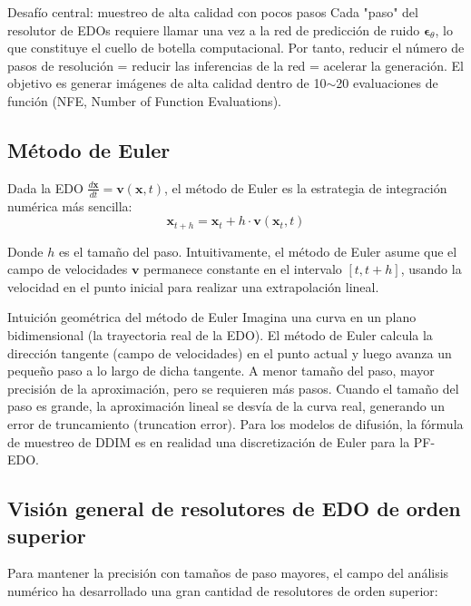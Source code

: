\documentclass[a4paper]{article}
\begin{document}
\begin{importantbox}{Desafío central: muestreo de alta calidad con pocos pasos}
Cada "paso" del resolutor de EDOs requiere llamar una vez a la red de predicción de ruido $\boldsymbol{\epsilon}_\theta$, lo que constituye el cuello de botella computacional. Por tanto, reducir el número de pasos de resolución = reducir las inferencias de la red = acelerar la generación. El objetivo es generar imágenes de alta calidad dentro de 10$\sim$20 evaluaciones de función (NFE, Number of Function Evaluations).
\end{importantbox}

\subsection{Método de Euler}

Dada la EDO $\frac{d\mathbf{x}}{dt} = \mathbf{v}(\mathbf{x}, t)$, el método de Euler es la estrategia de integración numérica más sencilla:
$$\mathbf{x}_{t+h} = \mathbf{x}_t + h \cdot \mathbf{v}(\mathbf{x}_t, t)$$

Donde $h$ es el tamaño del paso. Intuitivamente, el método de Euler asume que el campo de velocidades $\mathbf{v}$ permanece constante en el intervalo $[t, t+h]$, usando la velocidad en el punto inicial para realizar una extrapolación lineal.

\begin{knowledgebox}{Intuición geométrica del método de Euler}
Imagina una curva en un plano bidimensional (la trayectoria real de la EDO). El método de Euler calcula la dirección tangente (campo de velocidades) en el punto actual y luego avanza un pequeño paso a lo largo de dicha tangente. A menor tamaño del paso, mayor precisión de la aproximación, pero se requieren más pasos. Cuando el tamaño del paso es grande, la aproximación lineal se desvía de la curva real, generando un error de truncamiento (truncation error). Para los modelos de difusión, la fórmula de muestreo de DDIM es en realidad una discretización de Euler para la PF-EDO.
\end{knowledgebox}

\subsection{Visión general de resolutores de EDO de orden superior}

Para mantener la precisión con tamaños de paso mayores, el campo del análisis numérico ha desarrollado una gran cantidad de resolutores de orden superior:
\end{document}
